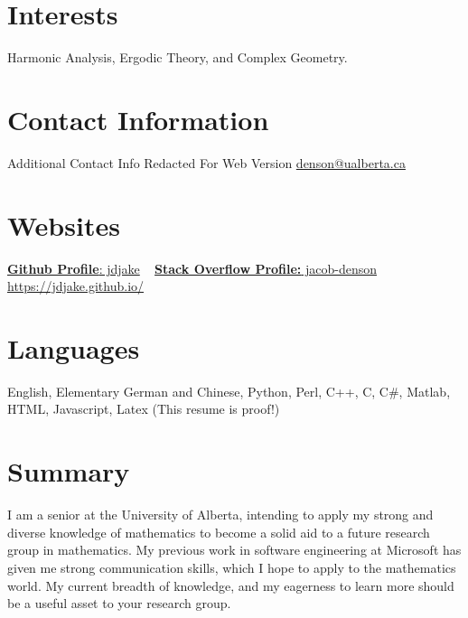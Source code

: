 \documentclass{friggeri-cv} %
\begin{document}


\begin{aside} %
\section{Interests}
Harmonic Analysis, Ergodic Theory, and Complex Geometry.
\section{Contact Information}
Additional Contact Info Redacted For Web Version
\href{mailto:denson@ualberta.ca}{denson@ualberta.ca}
\section{Websites}
\href{https://github.com/jdjake}{{\bf Github Profile}: jdjake}
~
\href{http://stackoverflow.com/users/2601483/jacob-denson}{{\bf Stack Overflow Profile:} jacob-denson}
~
\href{https://jdjake.github.io/}{https://jdjake.github.io/}
\section{Languages}
English, Elementary German and Chinese,
Python, Perl, C++, C, C\#, Matlab, HTML, Javascript, Latex (This resume is proof!)
\end{aside}


\section{Summary}

I am a senior at the University of Alberta, intending to apply my strong and diverse knowledge of mathematics to become a solid aid to a future research group in mathematics. My previous work in software engineering at Microsoft has given me strong communication skills, which I hope to apply to the mathematics world. My current breadth of knowledge, and my eagerness to learn more should be a useful asset to your research group.
\end{document}

